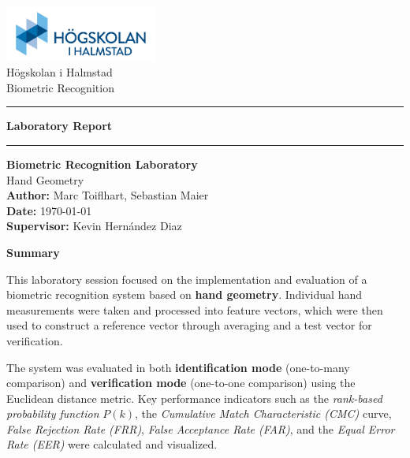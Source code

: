 \documentclass[a4paper,12pt]{article}
\begin{document}
\begin{titlepage}
    \centering
    \includegraphics[width=5cm]{Resources/hogskolan-halmstad-logo.png} \\[0.5cm] %
    Högskolan i Halmstad \\[0.2cm]
    Biometric Recognition \\[1.5cm]
    
    \hrule
    \vspace{0.4cm} %
    {\LARGE \textbf{Laboratory Report}}
    \vspace{0.4cm}
    \hrule
    \vspace{1.5cm} %

    {\Large \textbf{Biometric Recognition Laboratory}} \\[0.2cm]
    {\Large Hand Geometry} \\[1cm]
    
    \textbf{Author:} Marc Toiflhart, Sebastian Maier \\[0.2cm]
    \textbf{Date:} \today \\[0.2cm]
    \textbf{Supervisor:} Kevin Hernández Diaz

    \vfill
\end{titlepage}
\newpage

\tableofcontents
\newpage

\listoffigures
\newpage

\listoftables
\newpage


\begin{center}
    \textbf{Summary}
\end{center}

\noindent
This laboratory session focused on the implementation and evaluation of a biometric recognition system based on \textbf{hand geometry}. Individual hand measurements were taken and processed into feature vectors, which were then used to construct a reference vector through averaging and a test vector for verification.

\vspace{0.3em}
\noindent
The system was evaluated in both \textbf{identification mode} (one-to-many comparison) and \textbf{verification mode} (one-to-one comparison) using the Euclidean distance metric. Key performance indicators such as the \emph{rank-based probability function} $P(k)$, the \emph{Cumulative Match Characteristic (CMC)} curve, \emph{False Rejection Rate (FRR)}, \emph{False Acceptance Rate (FAR)}, and the \emph{Equal Error Rate (EER)} were calculated and visualized.
\end{document}
